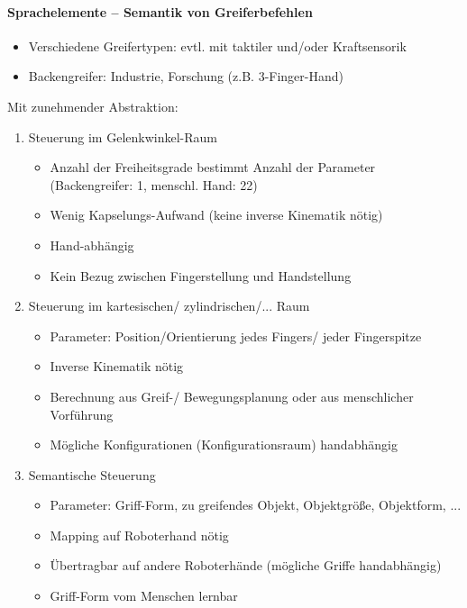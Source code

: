 \paragraph{Sprachelemente -- Semantik von Greiferbefehlen}
\begin{itemize}
\item Verschiedene Greifertypen: evtl. mit taktiler und/oder Kraftsensorik
\item Backengreifer: Industrie, Forschung (z.B. 3-Finger-Hand)
\end{itemize}
Mit zunehmender Abstraktion:
\begin{enumerate}
\item Steuerung im Gelenkwinkel-Raum
\begin{itemize}
\item Anzahl der Freiheitsgrade bestimmt Anzahl der Parameter (Backengreifer: 1, menschl. Hand: 22)
\item Wenig Kapselungs-Aufwand (keine inverse Kinematik nötig) 
\item Hand-abhängig
\item Kein Bezug zwischen Fingerstellung und Handstellung
\end{itemize}
\item Steuerung im kartesischen/ zylindrischen/... Raum
\begin{itemize}
\item Parameter: Position/Orientierung jedes Fingers/ jeder Fingerspitze
\item Inverse Kinematik nötig
\item Berechnung aus Greif-/ Bewegungsplanung oder aus menschlicher Vorführung
\item Mögliche Konfigurationen (Konfigurationsraum) handabhängig
\end{itemize}
\item Semantische Steuerung
\begin{itemize}
\item Parameter: Griff-Form, zu greifendes Objekt, Objektgröße, Objektform, ...
\item Mapping auf Roboterhand nötig
\item Übertragbar auf andere Roboterhände (mögliche Griffe handabhängig)
\item Griff-Form vom Menschen lernbar
\end{itemize}
\end{enumerate}
